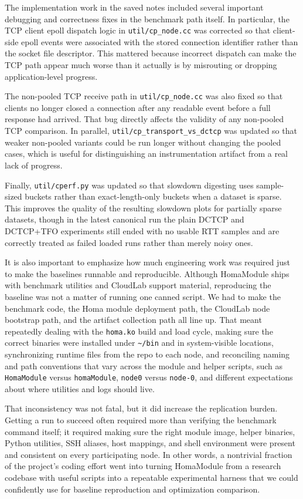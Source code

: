 \documentclass[11pt]{article}
\begin{document}
The implementation work in the saved notes included several important debugging and correctness fixes in the benchmark path itself. In particular, the TCP client epoll dispatch logic in \texttt{util/cp\_node.cc} was corrected so that client-side epoll events were associated with the stored connection identifier rather than the socket file descriptor. This mattered because incorrect dispatch can make the TCP path appear much worse than it actually is by misrouting or dropping application-level progress.

The non-pooled TCP receive path in \texttt{util/cp\_node.cc} was also fixed so that clients no longer closed a connection after any readable event before a full response had arrived. That bug directly affects the validity of any non-pooled TCP comparison. In parallel, \texttt{util/cp\_transport\_vs\_dctcp} was updated so that weaker non-pooled variants could be run longer without changing the pooled cases, which is useful for distinguishing an instrumentation artifact from a real lack of progress.

Finally, \texttt{util/cperf.py} was updated so that slowdown digesting uses sample-sized buckets rather than exact-length-only buckets when a dataset is sparse. This improves the quality of the resulting slowdown plots for partially sparse datasets, though in the latest canonical run the plain DCTCP and DCTCP+TFO experiments still ended with no usable RTT samples and are correctly treated as failed loaded runs rather than merely noisy ones.

It is also important to emphasize how much engineering work was required just to make the baselines runnable and reproducible. Although HomaModule ships with benchmark utilities and CloudLab support material, reproducing the baseline was not a matter of running one canned script. We had to make the benchmark code, the Homa module deployment path, the CloudLab node bootstrap path, and the artifact collection path all line up. That meant repeatedly dealing with the \texttt{homa.ko} build and load cycle, making sure the correct binaries were installed under \texttt{\textasciitilde/bin} and in system-visible locations, synchronizing runtime files from the repo to each node, and reconciling naming and path conventions that vary across the module and helper scripts, such as \texttt{HomaModule} versus \texttt{homaModule}, \texttt{node0} versus \texttt{node-0}, and different expectations about where utilities and logs should live.

That inconsistency was not fatal, but it did increase the replication burden. Getting a run to succeed often required more than verifying the benchmark command itself; it required making sure the right module image, helper binaries, Python utilities, SSH aliases, host mappings, and shell environment were present and consistent on every participating node. In other words, a nontrivial fraction of the project's coding effort went into turning HomaModule from a research codebase with useful scripts into a repeatable experimental harness that we could confidently use for baseline reproduction and optimization comparison.
\end{document}
